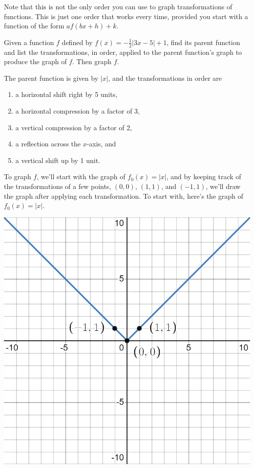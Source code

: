 \documentclass[handout, noauthor, nooutcomes]{ximera}
\begin{document}
Note that this is not the only order you can use to graph transformations of functions. This is just one order that works every time, provided you start with a function of the form $af(bx + h) + k$. 

\begin{example}
Given a function $f$ defined by $f(x) = -\frac{1}{2}|3x - 5| + 1$, find its parent function and list the transformations, in order, applied to the parent function's graph to produce the graph of $f$. Then graph $f$.
\begin{explanation}
The parent function is given by $|x|$, and the transformations in order are 
\begin{enumerate}
\item a horizontal shift right by 5 units,
\item a horizontal compression by a factor of 3,
\item a vertical compression by a factor of 2,
\item a reflection across the $x$-axis, and
\item a vertical shift up by 1 unit.
\end{enumerate}

To graph $f$, we'll start with the graph of $f_0(x) = |x|$, and by keeping track of the transformations of a few points, $(0, 0)$, $(1, 1)$, and $(-1, 1)$,  we'll draw the graph after applying each transformation. To start with, here's the graph of $f_0(x) = |x|$. 

\includegraphics[width=1\linewidth]{images/exgraph1.png}


\end{explanation}
\end{example}
\end{document}
